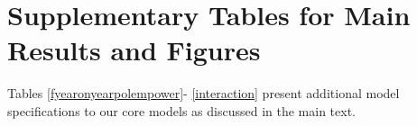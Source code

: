 {\renewcommand\normalsize{\tiny}%
	\normalsize
}



\section{Supplementary Tables for Main Results and Figures}
\vspace*{.2in}
\setlength{\parskip}{-2em}
\doublespacing
\setcounter{table}{0}
\setcounter{figure}{0}
\renewcommand{\thetable}{B\arabic{table}}	
\renewcommand{\thefigure}{B\arabic{figure}}	

Tables \ref{fyearonyearpolempower}- \ref{interaction} present additional model specifications to our core models as discussed in the main text.  \\


{\renewcommand\normalsize{\tiny}%
	\normalsize
}

{\renewcommand\normalsize{\tiny}%
	\normalsize
}

{\renewcommand\normalsize{\tiny}%
	\normalsize
}

{\renewcommand\normalsize{\tiny}%
	\normalsize
}

{\renewcommand\normalsize{\tiny}%
	\normalsize
}

{\renewcommand\normalsize{\tiny}%
	\normalsize
}

{\renewcommand\normalsize{\tiny}%
	\normalsize
}

